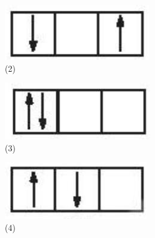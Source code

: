 \documentclass[10pt]{article}
\begin{document}
\begin{figure}[h]
\begin{center}
  \includegraphics[width=\textwidth]{2025_10_23_ee735750217b2aca435cg-03(3)}
\captionsetup{labelformat=empty}
\caption{(2)}
\end{center}
\end{figure}

\begin{figure}[h]
\begin{center}
  \includegraphics[width=\textwidth]{2025_10_23_ee735750217b2aca435cg-03}
\captionsetup{labelformat=empty}
\caption{(3)}
\end{center}
\end{figure}

\begin{figure}[h]
\begin{center}
  \includegraphics[width=\textwidth]{2025_10_23_ee735750217b2aca435cg-03(4)}
\captionsetup{labelformat=empty}
\caption{(4)}
\end{center}
\end{figure}
\end{document}
